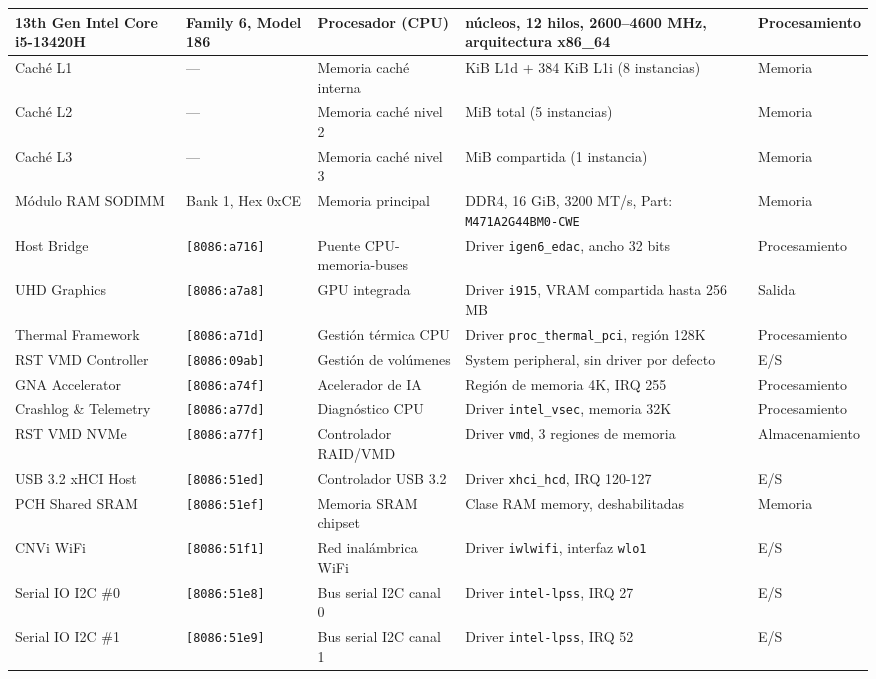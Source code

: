 \documentclass[10pt]{article}
\begin{document}
\begin{longtable}{|>{\raggedright\arraybackslash}p{2.5cm}|>{\raggedright\arraybackslash}p{2.0cm}|>{\raggedright\arraybackslash}p{2.5cm}|>{\raggedright\arraybackslash}p{4.5cm}|>{\raggedright\arraybackslash}p{2.0cm}|}
13th Gen Intel Core i5-13420H & Family 6, Model 186 & Procesador (CPU) & 8 núcleos, 12 hilos, 2600--4600 MHz, arquitectura x86\_64 & Procesamiento \\
\hline
Caché L1 & --- & Memoria caché interna & 320 KiB L1d + 384 KiB L1i (8 instancias) & Memoria \\
\hline
Caché L2 & --- & Memoria caché nivel 2 & 7 MiB total (5 instancias) & Memoria \\
\hline
Caché L3 & --- & Memoria caché nivel 3 & 12 MiB compartida (1 instancia) & Memoria \\
\hline
Módulo RAM SODIMM & Bank 1, Hex 0xCE & Memoria principal & DDR4, 16 GiB, 3200 MT/s, Part: \texttt{M471A2G44BM0-CWE} & Memoria \\
\hline
Host Bridge & \texttt{[8086:a716]} & Puente CPU-memoria-buses & Driver \texttt{igen6\_edac}, ancho 32 bits & Procesamiento \\
\hline
UHD Graphics & \texttt{[8086:a7a8]} & GPU integrada & Driver \texttt{i915}, VRAM compartida hasta 256 MB & Salida \\
\hline
Thermal Framework & \texttt{[8086:a71d]} & Gestión térmica CPU & Driver \texttt{proc\_thermal\_pci}, región 128K & Procesamiento \\
\hline
RST VMD Controller & \texttt{[8086:09ab]} & Gestión de volúmenes & System peripheral, sin driver por defecto & E/S \\
\hline
GNA Accelerator & \texttt{[8086:a74f]} & Acelerador de IA & Región de memoria 4K, IRQ 255 & Procesamiento \\
\hline
Crashlog \& Telemetry & \texttt{[8086:a77d]} & Diagnóstico CPU & Driver \texttt{intel\_vsec}, memoria 32K & Procesamiento \\
\hline
RST VMD NVMe & \texttt{[8086:a77f]} & Controlador RAID/VMD & Driver \texttt{vmd}, 3 regiones de memoria & Almacenamiento \\
\hline
USB 3.2 xHCI Host & \texttt{[8086:51ed]} & Controlador USB 3.2 & Driver \texttt{xhci\_hcd}, IRQ 120-127 & E/S \\
\hline
PCH Shared SRAM & \texttt{[8086:51ef]} & Memoria SRAM chipset & Clase RAM memory, deshabilitadas & Memoria \\
\hline
CNVi WiFi & \texttt{[8086:51f1]} & Red inalámbrica WiFi & Driver \texttt{iwlwifi}, interfaz \texttt{wlo1} & E/S \\
\hline
Serial IO I2C \#0 & \texttt{[8086:51e8]} & Bus serial I2C canal 0 & Driver \texttt{intel-lpss}, IRQ 27 & E/S \\
\hline
Serial IO I2C \#1 & \texttt{[8086:51e9]} & Bus serial I2C canal 1 & Driver \texttt{intel-lpss}, IRQ 52 & E/S \\

\end{longtable}
\end{document}
